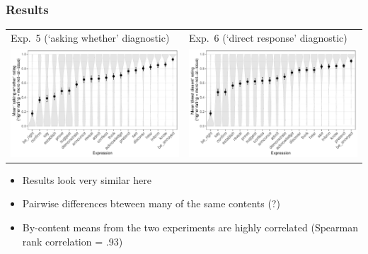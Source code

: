 \documentclass[compress, xcolor = dvipsnames, aspectratio=169]{beamer}
\begin{document}
	\begin{frame}[t]\frametitle{Results}\scriptsize

	      \centering
	      \begin{tabular}{p{.48\linewidth} p{.48\linewidth}}
	      	Exp.~5 (`asking whether' diagnostic)
	      	&
	      	Exp.~6 (`direct response' diagnostic)\\ 
	      	\includegraphics[width=\linewidth]{../../results/exp5/graphs/mean-ratings.pdf}%
	      	&
	      	\includegraphics[width=\linewidth]{../../results/exp6/graphs/mean-ratings.pdf}
	      	\\
	      \end{tabular}\pause

	      \vfill

	      \begin{itemize}
	      	\item Results look very similar here
	      	\item Pairwise differences bteween many of the same contents (?)\pause
	      	\item By-content means from the two experiments are highly correlated (Spearman rank correlation = .93)
	      \end{itemize}
	
	\end{frame}
\end{document}
